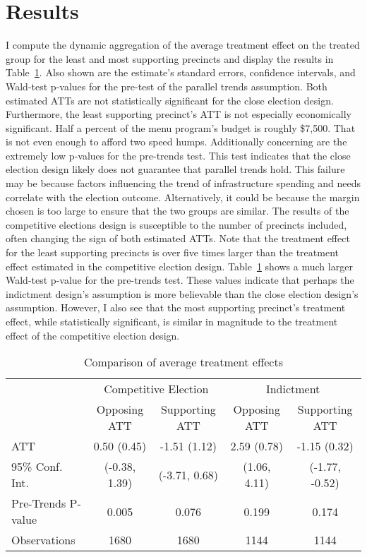 \section{Results}\label{sec:results}


I compute the dynamic aggregation of the average treatment effect on the treated group for the least and most supporting precincts and display the results in Table~\ref{tab:att_comparison_combined}.
Also shown are the estimate's standard errors, confidence intervals, and Wald-test p-values for the pre-test of the parallel trends assumption.
Both estimated ATTs are not statistically significant for the close election design.
Furthermore, the least supporting precinct's ATT is not especially economically significant. 
Half a percent of the menu program's budget is roughly \$7,500. 
That is not even enough to afford two speed humps.
Additionally concerning are the extremely low p-values for the pre-trends test.
This test indicates that the close election design likely does not guarantee that parallel trends hold.
This failure may be because factors influencing the trend of infrastructure spending and needs correlate with the election outcome.
Alternatively, it could be because the margin chosen is too large to ensure that the two groups are similar.
The results of the competitive elections design is susceptible to the number of precincts included, often changing the sign of both estimated ATTs.
Note that the treatment effect for the least supporting precincts is over five times larger than the treatment effect estimated in the competitive election design.
Table~\ref{tab:att_comparison_combined} shows a much larger Wald-test p-value for the pre-trends test.
These values indicate that perhaps the indictment design's assumption is more believable than the close election design's assumption.
However, I also see that the most supporting precinct's treatment effect, while statistically significant, is similar in magnitude to the treatment effect of the competitive election design.

\begin{table}[ht]
    \centering
    \caption{Comparison of average treatment effects}
    \label{tab:att_comparison_combined}
    \begin{tabular}{lcc|cc}
    \hline
     & \multicolumn{2}{c|}{Competitive Election} & \multicolumn{2}{c}{Indictment} \\
     & Opposing ATT & Supporting ATT & Opposing ATT & Supporting ATT \\
    \hline
    ATT & 0.50 (0.45) & -1.51 (1.12) & 2.59 (0.78) & -1.15 (0.32) \\
    95\% Conf. Int. & (-0.38, 1.39) & (-3.71, 0.68) & (1.06, 4.11) & (-1.77, -0.52) \\
    Pre-Trends P-value & 0.005  & 0.076 & 0.199 & 0.174 \\
    Observations & 1680 & 1680 & 1144 & 1144 \\
    \hline
    \end{tabular}
\end{table}

